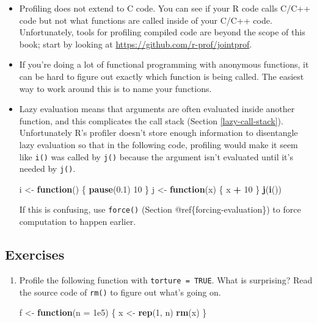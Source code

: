 \documentclass[]{book}
\newenvironment{Shaded}{\begin{snugshade}}{\end{snugshade}}
\newcommand{\ControlFlowTok}[1]{\textcolor[rgb]{0.27,0.27,0.27}{\textbf{#1}}}
\newcommand{\DataTypeTok}[1]{\textcolor[rgb]{0.27,0.27,0.27}{#1}}
\newcommand{\DecValTok}[1]{\textcolor[rgb]{0.06,0.06,0.06}{#1}}
\newcommand{\FloatTok}[1]{\textcolor[rgb]{0.06,0.06,0.06}{#1}}
\newcommand{\KeywordTok}[1]{\textcolor[rgb]{0.27,0.27,0.27}{\textbf{#1}}}
\newcommand{\NormalTok}[1]{#1}
\newcommand{\OperatorTok}[1]{\textcolor[rgb]{0.43,0.43,0.43}{\textbf{#1}}}
\newcommand{\StringTok}[1]{\textcolor[rgb]{0.5,0.5,0.5}{#1}}
\begin{document}
\begin{itemize}
\item
  Profiling does not extend to C code. You can see if your R code calls C/C++
  code but not what functions are called inside of your C/C++ code.
  Unfortunately, tools for profiling compiled code are beyond the scope of
  this book; start by looking at \url{https://github.com/r-prof/jointprof}.
\item
  If you're doing a lot of functional programming with anonymous functions,
  it can be hard to figure out exactly which function is being called.
  The easiest way to work around this is to name your functions.
\item
  Lazy evaluation means that arguments are often evaluated inside another
  function, and this complicates the call stack (Section
  \ref{lazy-call-stack}). Unfortunately R's profiler doesn't store enough
  information to disentangle lazy evaluation so that in the following code,
  profiling would make it seem like \texttt{i()} was called by \texttt{j()} because the
  argument isn't evaluated until it's needed by \texttt{j()}.

\begin{Shaded}
\begin{Highlighting}[]
\NormalTok{i <-}\StringTok{ }\ControlFlowTok{function}\NormalTok{() \{}
  \KeywordTok{pause}\NormalTok{(}\FloatTok{0.1}\NormalTok{)}
  \DecValTok{10}
\NormalTok{\}}
\NormalTok{j <-}\StringTok{ }\ControlFlowTok{function}\NormalTok{(x) \{}
\NormalTok{  x }\OperatorTok{+}\StringTok{ }\DecValTok{10}
\NormalTok{\}}
\KeywordTok{j}\NormalTok{(}\KeywordTok{i}\NormalTok{())}
\end{Highlighting}
\end{Shaded}

  If this is confusing, use \texttt{force()} (Section @ref\{forcing-evaluation\}) to
  force computation to happen earlier.
\end{itemize}

\hypertarget{exercises-16}{%
\subsection{Exercises}\label{exercises-16}}

\begin{enumerate}
\def\labelenumi{\arabic{enumi}.}
\item
  Profile the following function with \texttt{torture\ =\ TRUE}. What is
  surprising? Read the source code of \texttt{rm()} to figure out what's going on.

\begin{Shaded}
\begin{Highlighting}[]
\NormalTok{f <-}\StringTok{ }\ControlFlowTok{function}\NormalTok{(}\DataTypeTok{n =} \FloatTok{1e5}\NormalTok{) \{}
\NormalTok{  x <-}\StringTok{ }\KeywordTok{rep}\NormalTok{(}\DecValTok{1}\NormalTok{, n)}
  \KeywordTok{rm}\NormalTok{(x)}
\NormalTok{\}}
\end{Highlighting}
\end{Shaded}
\end{enumerate}
\end{document}
